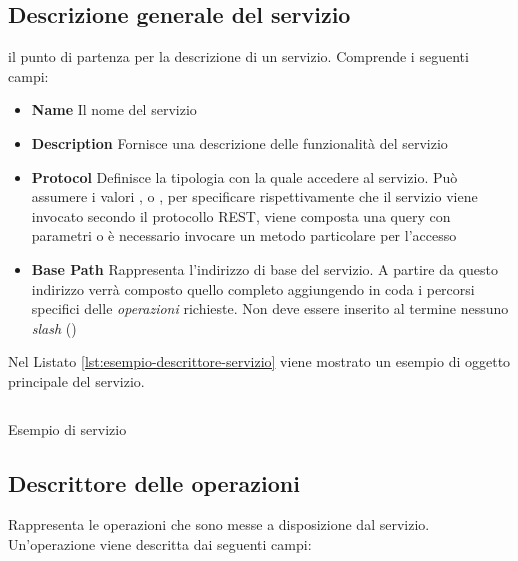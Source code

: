 \subsection{Descrizione generale del servizio\label{sec:oggetto-principale-servizi}}

\upe il punto di partenza per la descrizione di un servizio. Comprende i seguenti campi:

\begin{itemize}
	\item \textbf{Name}
	Il nome del servizio
	\item \textbf{Description}
	Fornisce una descrizione delle funzionalità del servizio
	\item \textbf{Protocol}
	Definisce la tipologia con la quale accedere al servizio. Può assumere i valori ,  o , per specificare rispettivamente che il servizio viene invocato secondo il protocollo REST, viene composta una query con parametri o è necessario invocare un metodo particolare per l'accesso
	\item \textbf{Base Path}
	Rappresenta l'indirizzo di base del servizio. A partire da questo indirizzo verrà composto quello completo aggiungendo in coda i percorsi specifici delle \emph{operazioni} richieste. Non deve essere inserito al termine nessuno \emph{slash} (\virgolette{/})
\end{itemize}

Nel Listato \ref{lst:esempio-descrittore-servizio} viene mostrato un esempio di oggetto principale del servizio.

\begin{listing}[H]
	\inputminted{json}{5-implementazione-backend/Codice/esempio_descrittore_servizio.json}
	\caption{Esempio di servizio}
	\label{lst:esempio-descrittore-servizio}
\end{listing}

\subsection{Descrittore delle operazioni\label{sec:descrittore-operazioni}}

Rappresenta le operazioni che sono messe a disposizione dal servizio. Un'o\-pe\-ra\-zio\-ne viene descritta dai seguenti campi:

